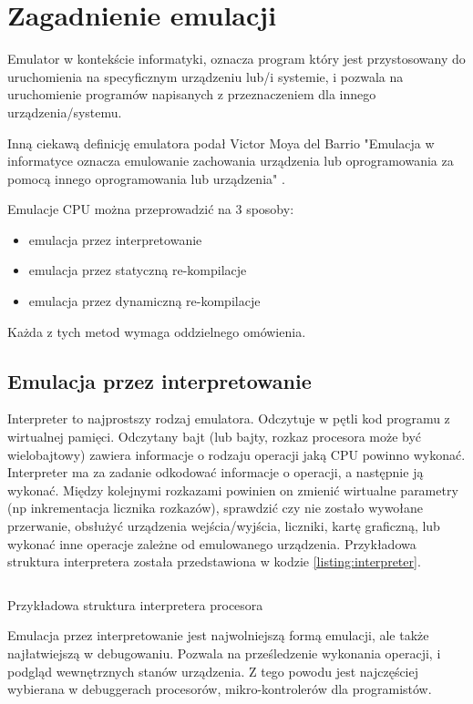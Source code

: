 \chapter{Zagadnienie emulacji}
	
	Emulator w kontekście informatyki, oznacza program który jest przystosowany do uruchomienia na specyficznym urządzeniu lub/i systemie, i pozwala na uruchomienie programów napisanych z przeznaczeniem dla innego urządzenia/systemu\cite{howDoIWriteAnEmulator}. 
	
	Inną ciekawą definicję emulatora podał Victor Moya del Barrio "Emulacja w informatyce oznacza emulowanie zachowania urządzenia lub oprogramowania za pomocą innego oprogramowania lub urządzenia"
	\cite{studyofthetechniquesforemulationprogramming}.
		
	Emulacje CPU można przeprowadzić na 3 sposoby:\cite{fms_komkon_org_howto}	
	\begin{itemize}  
		\item emulacja przez interpretowanie
		\item emulacja przez statyczną re-kompilacje
		\item emulacja przez dynamiczną re-kompilacje
	\end{itemize} 
	Każda z tych metod wymaga oddzielnego omówienia.
	
	\section{Emulacja przez interpretowanie}
	Interpreter to najprostszy rodzaj emulatora. Odczytuje w pętli kod programu z wirtualnej pamięci. Odczytany bajt (lub bajty, rozkaz procesora może być wielobajtowy) zawiera informacje o rodzaju operacji jaką CPU powinno wykonać. Interpreter ma za zadanie odkodować informacje o operacji, a następnie ją wykonać. Między kolejnymi rozkazami powinien on zmienić wirtualne parametry (np inkrementacja licznika rozkazów), sprawdzić czy nie zostało wywołane przerwanie, obsłużyć urządzenia wejścia/wyjścia, liczniki, kartę graficzną, lub wykonać inne operacje zależne od emulowanego urządzenia. Przykładowa struktura interpretera została przedstawiona w kodzie \ref{listing:interpreter}.
	
	\begin{listing}[h]
		\inputminted{java}{listings/interpreter.c}
		\caption{Przykładowa struktura interpretera procesora}
		\label{listing:interpreter}
	\end{listing}
		
	Emulacja przez interpretowanie jest najwolniejszą formą emulacji, ale także najłatwiejszą w debugowaniu. Pozwala na prześledzenie wykonania operacji, i podgląd wewnętrznych stanów urządzenia. Z tego powodu jest najczęściej wybierana w debuggerach procesorów, mikro-kontrolerów dla programistów.
	
